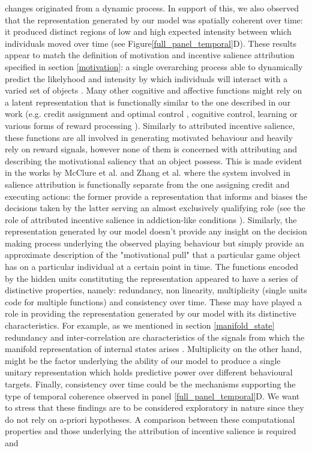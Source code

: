 changes originated from a dynamic process. In support of this, we also observed that the representation generated by our model was spatially coherent over time: it produced distinct regions of low and high expected intensity between which individuals moved over time (see Figure\ref{full_panel_temporal}D). These results appear to match the definition of motivation and incentive salience attribution specified in section \ref{motivation}: a single overarching process able to dynamically predict the likelyhood and intensity by which individuals will interact with a varied set of objects \cite{simpson2016behavioral,toates1994comparing,berridge2004motivation,zhang2009neural}. Many other cognitive and affective functions might rely on a latent representation that is functionally similar to the one described in our work (e.g. credit assignment and optimal control \cite{wang2018prefrontal, barto2004reinforcement}, cognitive control, learning \cite{skinner1965science} or various forms of reward processing \cite{schultz1997neural, schultz2000reward}). Similarly to attributed incentive salience, these functions are all involved in generating motivated behaviour and heavily rely on reward signals, however none of them is concerned with attributing and describing the motivational saliency that an object possess. This is made evident in the works by McClure et al. \cite{mcclure2003computational} and Zhang et al. \cite{zhang2009neural} where the system involved in salience attribution is functionally separate from the one assigning credit and executing actions: the former provide a representation that informs and biases the decisions taken by the latter serving an almost exclusively qualifying role (see the role of attributed incentive salience in addiction-like conditions \cite{robinson1993neural}). Similarly, the representation generated by our model doesn't provide any insight on the decision making process underlying the observed playing behaviour but simply provide an approximate description of the "motivational pull" that a particular game object has on a particular individual at a certain point in time. The functions encoded by the hidden units constituting the representation appeared to have a series of distinctive properties, namely: redundancy, non linearity, multiplicity (single units code for multiple functions) and consistency over time. These may have played a role in providing the representation generated by our model with its distinctive characteristics. For example, as we mentioned in section \ref{manifold_state} redundancy and inter-correlation are characteristics of the signals from which the manifold representation of internal states arises \cite{seung2000manifold,gallego2017neural}. Multiplicity on the other hand, might be the factor underlying the ability of our model to produce a single unitary representation which holds predictive power over different behavioural targets. Finally, consistency over time could be the mechanisms supporting the type of temporal coherence observed in panel \ref{full_panel_temporal}D. We want to stress that these findings are to be considered exploratory in nature since they do not rely on a-priori hypotheses. A comparison between these computational properties and those underlying the attribution of incentive salience is required and 